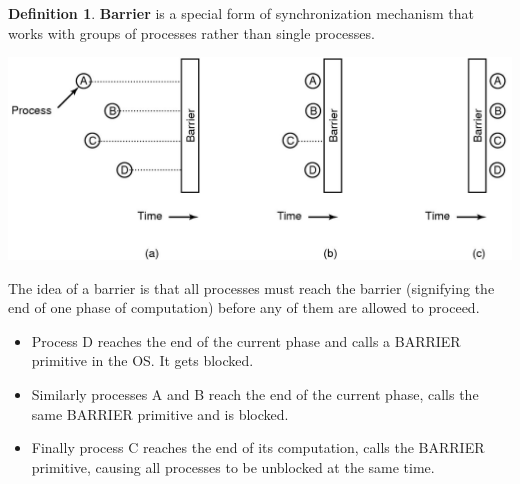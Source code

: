 \documentclass[12pt,a4paper]{article}
\theoremstyle{definition}
\newtheorem{definition}{Definition}[section]
\newenvironment{myitemize}
{ \begin{itemize}
    \setlength{\itemsep}{5pt}
    \setlength{\parskip}{0pt}
    \setlength{\parsep}{0pt}     }
{ \end{itemize}                  }
\begin{document}
\begin{definition}{\textbf{Barrier}}
	is a special form of synchronization mechanism that works with groups of processes rather than single processes.
	\begin{center}
		\includegraphics[scale=0.5]{m1/barrier}
	\end{center}
	
	The idea of a barrier is that all processes must reach the barrier (signifying the end of one phase of computation) before any of them are allowed to proceed.
	\begin{myitemize}
		\item Process D reaches the end of the current phase and calls a BARRIER primitive in the OS. It gets blocked.
		\item Similarly processes A and B reach the end of the current phase, calls the same BARRIER primitive and is blocked.
		\item Finally process C reaches the end of its computation, calls the BARRIER primitive, causing all processes to be unblocked at the same time.
	\end{myitemize}
\end{definition}
\end{document}
